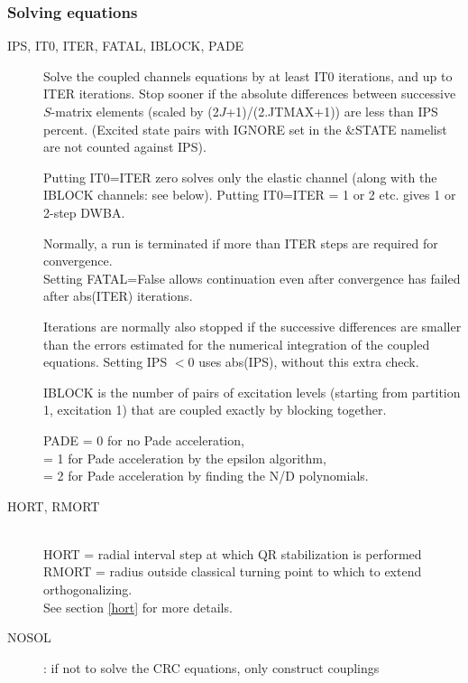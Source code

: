 \documentclass[11pt]{article}
\begin{document}
\subsubsection{Solving equations}

\begin{description}
\item[IPS, IT0, ITER, FATAL, IBLOCK, PADE]

Solve the coupled channels equations by at least IT0 iterations, and
up to ITER iterations.
Stop sooner if the absolute differences between successive $S$-matrix
elements (scaled by (2$J$+1)/(2.JTMAX+1)) are less than IPS percent.
(Excited state pairs with IGNORE set in the \&STATE namelist are not counted against IPS).

Putting IT0=ITER zero solves only the elastic channel (along with the
IBLOCK channels: see below).
Putting IT0=ITER = 1 or 2 etc. gives 1 or 2-step DWBA.

Normally, a run is terminated if more than ITER steps are required for
convergence. \\
Setting FATAL=False allows continuation even after
convergence has failed after abs(ITER) iterations.

Iterations are normally also stopped if the successive differences are smaller
than the errors estimated for the numerical integration of the coupled
equations. Setting IPS $< 0$ uses abs(IPS), without this extra check.

IBLOCK is the number of pairs of excitation levels
(starting from partition 1, excitation 1) that are coupled exactly by
blocking together.

PADE
 = 0 for no Pade acceleration,
\\ = 1 for Pade acceleration by the epsilon algorithm,
\\ = 2 for Pade acceleration by finding the N/D polynomials.

\item[HORT, RMORT]~\\
HORT = radial interval step at which QR stabilization is performed\\
RMORT = radius outside classical turning point to which to extend orthogonalizing. \\
See section \ref{hort} for more details.

\item[NOSOL] : if not to solve the CRC equations, only construct couplings


\end{description}
\end{document}
